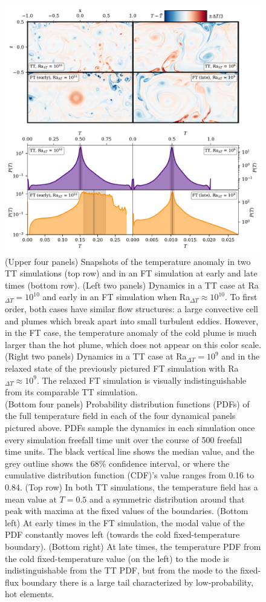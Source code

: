 \documentclass[aps, pre, onecolumn, nofootinbib, notitlepage, groupedaddress, amsfonts, amssymb, amsmath, longbibliography, superscriptaddress]{revtex4-1}
\begin{document}
\begin{figure}[p!]
\includegraphics[width=\textwidth]{./figs/rbc_evolution_dynamics.pdf}
\caption{ 
	(Upper four panels) Snapshots of the temperature anomaly in two TT simulations (top row) and in an FT simulation at early and late times (bottom row).
	(Left two panels) Dynamics in a TT case at Ra$_{\Delta T} = 10^{10}$ and early in an FT simulation when Ra$_{\Delta T} \approx 10^{10}$.
	To first order, both cases have similar flow structures: a large convective cell and plumes which break apart into small turbulent eddies.
	However, in the FT case, the temperature anomaly of the cold plume is much larger than the hot plume, which does not appear on this color scale.
	(Right two panels) Dynamics in a TT case at Ra$_{\Delta T} = 10^9$ and in the relaxed state of the previously pictured FT simulation with Ra$_{\Delta T} \approx 10^9$.
	The relaxed FT simulation is visually indistinguishable from its comparable TT simulation.
\\	
	(Bottom four panels) Probability distribution functions (PDFs) of the full temperature field in each of the four dynamical panels pictured above.
	PDFs sample the dynamics in each simulation once every simulation freefall time unit over the course of 500 freefall time units.
	The black vertical line shows the median value, and the grey outline shows the 68\% confidence interval, or where the cumulative distribution function (CDF)'s value ranges from 0.16 to 0.84.
	(Top row) In both TT simulations, the temperature field has a mean value at $T = 0.5$ and a symmetric distribution around that peak with maxima at the fixed values of the boundaries. 
	(Bottom left) At early times in the FT simulation, the modal value of the PDF constantly moves left (towards the cold fixed-temperature boundary).
	(Bottom right) At late times, the temperature PDF from the cold fixed-temperature value (on the left) to the mode is indistinguishable from the TT PDF, but from the mode to the fixed-flux boundary there is a large tail characterized by low-probability, hot elements.
	\label{fig:rbc_evolution_dynamics} }
\end{figure}
\end{document}
